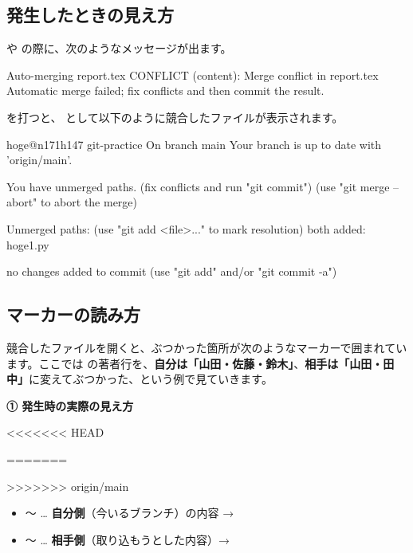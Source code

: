 \subsection{発生したときの見え方}

 や  の際に、次のようなメッセージが出ます。

\begin{codebox}[text]
\begin{code}
Auto-merging report.tex
CONFLICT (content): Merge conflict in report.tex
Automatic merge failed; fix conflicts and then commit the result.
\end{code}
\end{codebox}

 を打つと、 として以下のように競合したファイルが表示されます。

\begin{codebox}[text]
\begin{code}
hoge@n171h147 git-practice %
On branch main
Your branch is up to date with 'origin/main'.

You have unmerged paths.
  (fix conflicts and run "git commit")
  (use "git merge --abort" to abort the merge)

Unmerged paths:
  (use "git add <file>..." to mark resolution)
        both added:      hoge1.py

no changes added to commit (use "git add" and/or "git commit -a")
\end{code}
\end{codebox}

\subsection{マーカーの読み方}

競合したファイルを開くと、ぶつかった箇所が次のようなマーカーで囲まれています。ここでは  の著者行を、\textbf{自分は「山田・佐藤・鈴木」}、\textbf{相手は「山田・田中」}に変えてぶつかった、という例で見ていきます。

\noindent\textbf{① 発生時の実際の見え方}

\begin{codebox}[text]
\begin{code}
<<<<<<< HEAD
\author{山田, 佐藤, 鈴木}
=======
\author{山田, 田中}
>>>>>>> origin/main
\end{code}
\end{codebox}

\begin{itemize}[leftmargin=1.4em]
  \item {} 〜 \cmd{=======} … \textbf{自分側}（今いるブランチ）の内容 → 
  \item \cmd{=======} 〜  … \textbf{相手側}（取り込もうとした内容）→ 
\end{itemize}

